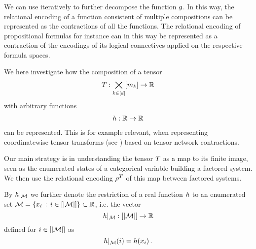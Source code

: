 
We can use  iteratively to further decompose the function $g$.
In this way, the relational encoding of a function consistent of multiple compositions can be represented as the contractions of all the functions.
The relational encoding of propositional formulas for instance can in this way be represented as a contraction of the encodings of its logical connectives applied on the respective formula spaces. 





We here investigate how the composition of a tensor
\begin{align*}
	T : \bigtimes_{k\in[d]}[m_{k}] \rightarrow \mathbb{R}
\end{align*}
with arbitrary functions
\begin{align*}
	h: \mathbb{R} \rightarrow \mathbb{R}
\end{align*}
can be represented.
This is for example relevant, when representing coordinatewise tensor transforms (see ) based on tensor network contractions.

Our main strategy is in understanding the tensor $T$ as a map to its finite image, seen as the enumerated states of a categorical variable building a factored system.
We then use the relational encoding $\rho^{T}$ of this map between factored systems. 

By ${h}|_{\mathcal{M}}$ we further denote the restriction of a real function $h$ to an enumerated set $\mathcal{M} =\{x_i \, : \, i \in [\left|\mathcal{M}\right|]\} \subset \mathbb{R}$, i.e. the vector
	\[ {h}|_{\mathcal{M}} : [\left|\mathcal{M}\right|] \rightarrow \mathbb{R} \]
defined for $i \in [\left|\mathcal{M}\right|]$ as
	\[ {h}|_{\mathcal{M}}(i) = h(x_i) \, . \]


